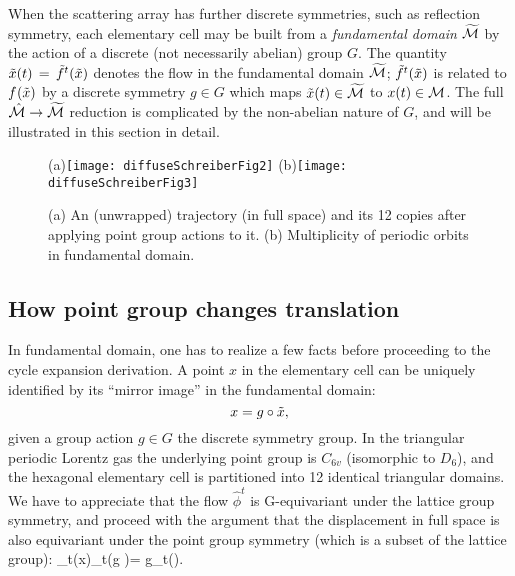 \documentclass[aps,pre,showpacs,preprint,groupedaddress,floatfix]{revtex4-1}
\begin{document}
When the scattering array has further discrete symmetries, such as
reflection symmetry, each elementary cell may be built from a {\em
  fundamental domain} ${\widetilde {{\cal M}}}$ by the action of a discrete
(not necessarily abelian) group $G$. The quantity
$\tilde x(t)\,=\,{\tilde{f}^{t}(\tilde x)}$ denotes the flow in the fundamental domain
${\widetilde {{\cal M}}}$; ${\tilde{f}^{t}(\tilde x)}$ is related to ${f^{}(\tilde x)}$ by a
discrete symmetry $g \in G$ which maps $\tilde x(t)\in {\widetilde {\ensuremath{{\cal M}}}}$ to
${x}(t) \in {\ensuremath{{\cal M}}}$. The full $\hat {{\cal M}} \rightarrow {\widetilde {\ensuremath{{\cal M}}}}$ reduction is complicated by the non-abelian nature of $G$, and will be
illustrated in this section in detail.


\begin{figure}[htbp]
  \begin{center}
    (a)\texttt{[image: diffuseSchreiberFig2]}
    (b)\texttt{[image: diffuseSchreiberFig3]}
  \end{center}
  \caption[]{ \label{fig:schrieberFig23} (a) An (unwrapped) trajectory
    (in full space) and its 12 copies after applying point group
    actions to it. (b) Multiplicity of periodic orbits in fundamental
    domain.}
\end{figure}

\subsection{How point group changes translation}


In fundamental domain, one has to realize a few facts before
proceeding to the cycle expansion derivation. A point $x$ in the
elementary cell can be uniquely identified by its ``mirror image'' in
the fundamental domain:
\[
x=g\circ\tilde x,
\]
given a group action $g\in G$ the discrete symmetry group. In the
triangular periodic Lorentz gas the underlying point group is $C_{6v}$
(isomorphic to $D_6$), and the hexagonal elementary cell is
partitioned into 12 identical triangular domains. We have to
appreciate that the flow $\hat{\phi}^t$ is G-equivariant under the lattice
group symmetry, and proceed with the argument that the displacement in
full space is also equivariant under the point group symmetry (which
is a subset of the lattice group): \beq \hn_t(x)\equiv\hn_t(g\circ
\tx)= g\circ\hn_t(\tx).  \eeq
\end{document}
